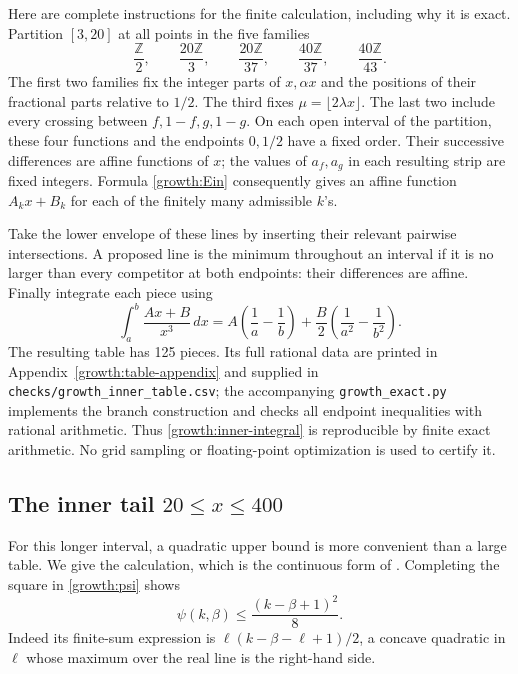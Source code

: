 Here are complete instructions for the finite calculation, including
why it is exact. Partition \([3,20]\) at all points in the five families
\begin{equation}\label{growth:grid}
 \frac{\mathbb Z}{2},\qquad
 \frac{20\mathbb Z}{3},\qquad
 \frac{20\mathbb Z}{37},\qquad
 \frac{40\mathbb Z}{37},\qquad
 \frac{40\mathbb Z}{43}.
\end{equation}
The first two families fix the integer parts of \(x,\alpha x\)
and the positions of their fractional parts relative to \(1/2\).
The third fixes \(\mu=\lfloor2\lambda x\rfloor\). The last two
include every crossing between \(f,1-f,g,1-g\). On each open interval
of the partition, these four functions and the endpoints \(0,1/2\)
have a fixed order. Their successive differences are affine functions
of \(x\); the values of \(a_f,a_g\) in each resulting strip are fixed
integers. Formula \eqref{growth:Ein} consequently gives an affine
function \(A_kx+B_k\) for each of the finitely many admissible \(k\)'s.

Take the lower envelope of these lines by inserting their relevant
pairwise intersections. A proposed line is the minimum throughout
an interval if it is no larger than every competitor at both
endpoints: their differences are affine. Finally integrate each
piece using
\begin{equation}\label{growth:affine-integral}
 \int_a^b\frac{Ax+B}{x^3}\,dx
 =A\left(\frac1a-\frac1b\right)
  +\frac B2\left(\frac1{a^2}-\frac1{b^2}\right).
\end{equation}
The resulting table has 125 pieces. Its full rational data are
printed in Appendix~\ref{growth:table-appendix} and supplied in
\texttt{checks/growth\_inner\_table.csv};
the accompanying \texttt{growth\_exact.py} implements the branch
construction and checks all endpoint inequalities with rational
arithmetic. Thus \eqref{growth:inner-integral} is reproducible by
finite exact arithmetic. No grid sampling or floating-point
optimization is used to certify it.

\subsection{The inner tail \texorpdfstring{\(20\le x\le400\)}{20 <= x <= 400}}

For this longer interval, a quadratic upper bound is more convenient
than a large table. We give the calculation, which is the continuous
form of \cite[\texttt{Growth/TailPrime.lean}]{firsching}.
Completing the square in \eqref{growth:psi} shows
\[
 \psi(k,\beta)\le\frac{(k-\beta+1)^2}{8}.
\]
Indeed its finite-sum expression is
\(\ell(k-\beta-\ell+1)/2\), a concave quadratic in \(\ell\)
whose maximum over the real line is the right-hand side.


